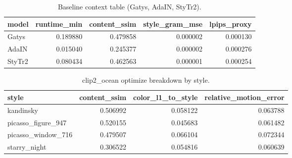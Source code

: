 \documentclass[12pt,letterpaper]{article}
\begin{document}
\begin{table}[htbp]
\centering
\footnotesize
\setlength{\tabcolsep}{4pt}

\begin{tabular}{lrrrr}
\toprule
model & runtime\_min & content\_ssim & style\_gram\_mse & lpips\_proxy \\
\midrule
Gatys & 0.189880 & 0.479858 & 0.000002 & 0.000130 \\
AdaIN & 0.015040 & 0.245377 & 0.000002 & 0.000276 \\
StyTr2 & 0.080434 & 0.462563 & 0.000001 & 0.000254 \\
\bottomrule
\end{tabular}

\caption{Baseline context table (Gatys, AdaIN, StyTr2).}
\label{tab:model-context}
\end{table}


\begin{table}[htbp]
\centering
\footnotesize
\setlength{\tabcolsep}{4pt}
\caption{Real-video strict summary (core metrics).}
\label{tab:video-summary}
\end{table}


\begin{table}[htbp]
\centering
\footnotesize
\setlength{\tabcolsep}{4pt}

\begin{tabular}{lrrr}
\toprule
style & content\_ssim & color\_l1\_to\_style & relative\_motion\_error \\
\midrule
kandinsky & 0.506992 & 0.058122 & 0.063788 \\
picasso\_figure\_947 & 0.520155 & 0.045683 & 0.061482 \\
picasso\_window\_716 & 0.479507 & 0.066104 & 0.072344 \\
starry\_night & 0.306522 & 0.054816 & 0.060639 \\
\bottomrule
\end{tabular}

\caption{clip2\_ocean optimize breakdown by style.}
\label{tab:ocean-breakdown}
\end{table}
\end{document}
